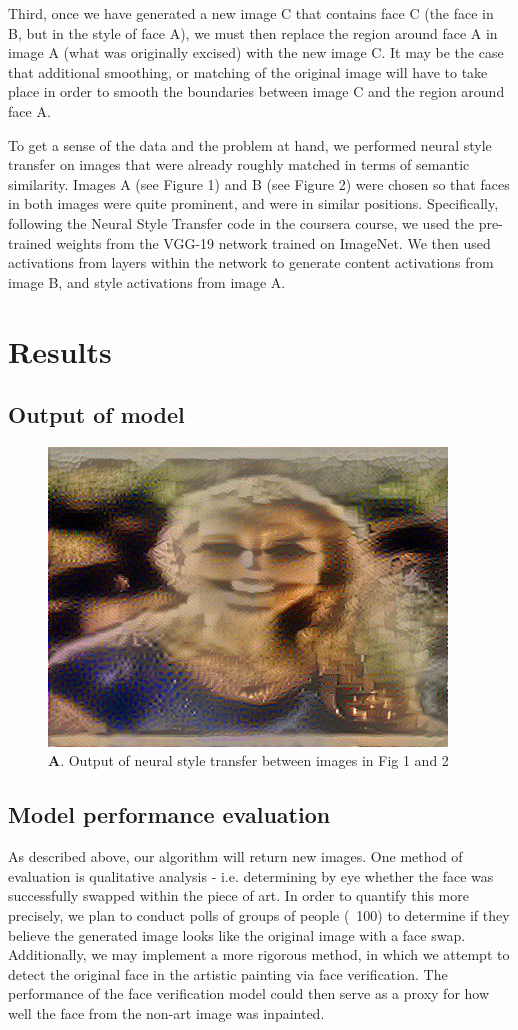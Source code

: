 \documentclass{pnastwo2}
\begin{document}
\begin{article}
Third, once we have generated a new image C that contains face C (the face in B, but in the style of face A), we must then replace the region around face A in image A (what was originally excised) with the new image C. It may be the case that additional smoothing, or matching of the original image will have to take place in order to smooth the boundaries between image C and the region around face A. 

To get a sense of the data and the problem at hand, we performed neural style transfer on images that were already roughly matched in terms of semantic similarity. Images A (see Figure 1) and B (see Figure 2) were chosen so that faces in both images were quite prominent, and were in similar positions. Specifically, following the Neural Style Transfer code in the coursera course, we used the pre-trained weights from the VGG-19 network trained on ImageNet. We then used activations from layers within the network to generate content activations from image B, and style activations from image A. 

\section{Results}

\subsection{Output of model}

\begin{figure}
	\begin{center}
		\includegraphics[width=.3\textwidth]{nst.png}
		\caption{{\bfseries A}. Output of neural style transfer between images in Fig 1 and 2} \label{fig:nst}
	\end{center}
\end{figure} 

\subsection{Model performance evaluation}

As described above, our algorithm will return new images. One method of evaluation is qualitative analysis - i.e. determining by eye whether the face was successfully swapped within the piece of art. In order to quantify this more precisely, we plan to conduct polls of groups of people (~100) to determine if they believe the generated image looks like the original image with a face swap. Additionally, we may implement a more rigorous method, in which we attempt to detect the original face in the artistic painting via face verification. The performance of the face verification model could then serve as a proxy for how well the face from the non-art image was inpainted.


\end{article}
\end{document}
